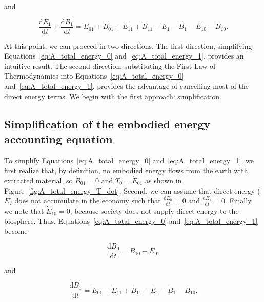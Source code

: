 \noindent and

\begin{equation} \label{eq:A_total_energy_1}
	\frac{\mathrm{d}E_{1}}{\mathrm{d}t} 
	+ \frac{\mathrm{d}B_{1}}{\mathrm{d}t} 
	= \dot{E}_{01} 
	+ \dot{B}_{01} 
	+ \dot{E}_{11}
	+ \dot{B}_{11}
	- \dot{E}_{1}
	- \dot{B}_{1}
	- \dot{E}_{10}
	- \dot{B}_{10}.	
\end{equation}

At this point, we can proceed in two directions.
The first direction, 
simplifying Equations~\ref{eq:A_total_energy_0} 
and~\ref{eq:A_total_energy_1}, 
provides an intuitive result. 
The second direction,
substituting the First Law of Thermodynamics
into 
Equations~\ref{eq:A_total_energy_0} 
and~\ref{eq:A_total_energy_1}, 
provides the advantage of cancelling most of the direct energy terms.
We begin with the first approach: simplification.


\subsection{Simplification of the embodied energy accounting equation} %
\label{sec:A_simplified_embodied}

To simplify Equations~\ref{eq:A_total_energy_0} 
and~\ref{eq:A_total_energy_1},
we first realize that, by definition, no embodied energy flows from 
the earth with extracted material, so $\dot{B}_{01} = 0$
and $\dot{T}_{0} = \dot{E}_{01}$ as shown in Figure~\ref{fig:A_total_energy_T_dot}.
Second, we can assume that direct energy ($E$) does not accumulate
in the economy such that 
$\frac{\mathrm{d}E_0}{\mathrm{d}t} = 0$ and
$\frac{\mathrm{d}E_1}{\mathrm{d}t} = 0$.
Finally, we note that $\dot{E}_{10} = 0$, 
because society does not supply direct energy 
to the biosphere. Thus, Equations~\ref{eq:A_total_energy_0}
and~\ref{eq:A_total_energy_1} become

\begin{equation} \label{eq:A_total_energy_0_simp}
	\frac{\mathrm{d}B_{0}}{\mathrm{d}t} 
	= \dot{B}_{10} 
	- \dot{E}_{01}
\end{equation}

\noindent and

\begin{equation} \label{eq:A_total_energy_1_simp}
	\frac{\mathrm{d}B_{1}}{\mathrm{d}t} 
	= \dot{E}_{01} 
	+ \dot{E}_{11}
	+ \dot{B}_{11}
	- \dot{E}_{1}
	- \dot{B}_{1}
	- \dot{B}_{10}.	
\end{equation}

